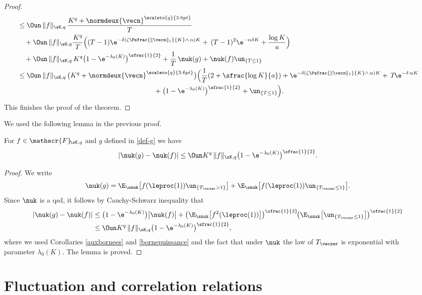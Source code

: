 \begin{proof}
\begin{align*}
& \le \Oun\, \|f\|_{\sK,q}\,\frac{K^{q}+\normdeux{\vecn}^{\scaleto{q}{3.6pt}}}{T}\\
& \quad +\Oun\, \|f\|_{\sK,q} \frac{K^q}{T}\Bigl((T-1)\e^{-\delta\left(\zeta\Psfrac{\|\vecn\|_{1}}{K}\wedge\,\alpha\right)K}+\, (T-1)^2\e^{-\alpha\delta K}+\frac{\log K}{a}\Bigr)\\
& \quad + \Oun\, \|f\|_{\sK,q}\, K^q \bigl(1-\e^{-\lambda_0(K)}\bigr)^{\sfrac{1}{2}} + \frac{1}{T}\, \nuk(g) +
\nuk(f)\un_{\{T\leq 1\}}\\
& \leq \Oun\, \|f\|_{\sK,q}\, \bigl(K^{q}+\normdeux{\vecn}^{\scaleto{q}{3.6pt}}\bigr) \Bigl(\frac{1}{T}(2+\sfrac{\log K}{a }) +
\e^{-\delta\left(\zeta\Psfrac{\|\vecn\|_{1}}{K}\wedge\,\alpha\right)K} +\, T\!\e^{-\delta\,\alpha K}\\
& \hspace*{6.9cm} + \bigl(1-\e^{-\lambda_0(K)}\bigr)^{\sfrac{1}{2}} + \un_{\{T\leq 1\}}\Bigr).
\end{align*}
This finishes the proof of the theorem.
\end{proof}

We used the following lemma in the previous proof.
\begin{lemma}
\label{f-et-g}
For $f\in \mathscr{F}\!_{\sK,q}$ and $g$ defined in \eqref{def-g} we have
\[
|\nuk(g)-\nuk(f)|\leq \Oun K^q\, \|f\|_{\sK,q}\bigl(1-\e^{-\lambda_0(K)}\bigr)^{\sfrac{1}{2}}.
\]
\end{lemma}
\begin{proof}
We write
\[
\nuk(g)= \E_{\snuk}\bigl[f(\leproc(1)) \un_{\{T_{\veczer}>1\}}\bigr]
+
\E_{\snuk}\bigl[f(\leproc(1)) \un_{\{T_{\veczer}\leq 1\}}\bigr].
\]
Since $\nuk$ is a qsd, it follows by Cauchy-Schwarz inequality that
\begin{align*}
|\nuk(g)-\nuk(f)|
& \leq \bigl(1-\e^{-\lambda_0(K)}\bigr)\big|\nuk(f)\big|+ \bigl(\E_{\snuk}\bigl[f^2(\leproc(1))\bigr]\bigr)^{\sfrac{1}{2}} \!
\bigl(\E_{\snuk}\bigl[\un_{\{T_{\veczer}\leq 1\}}\bigr] \bigr)^{\sfrac{1}{2}}\\
& \leq\Oun K^q\, \|f\|_{\sK,q} \bigl(1-\e^{-\lambda_0(K)}\bigr)^{\sfrac{1}{2}},
\end{align*}
where we used Corollaries \ref{auxbornees} and \ref{bornepuissance} and the fact that under $\nuk$ the law of $T_{\veczer}
$ is exponential with parameter $\lambda_0(K)$. The lemma is proved.
\end{proof}

\section{Fluctuation and correlation relations}
\label{chaleur}
